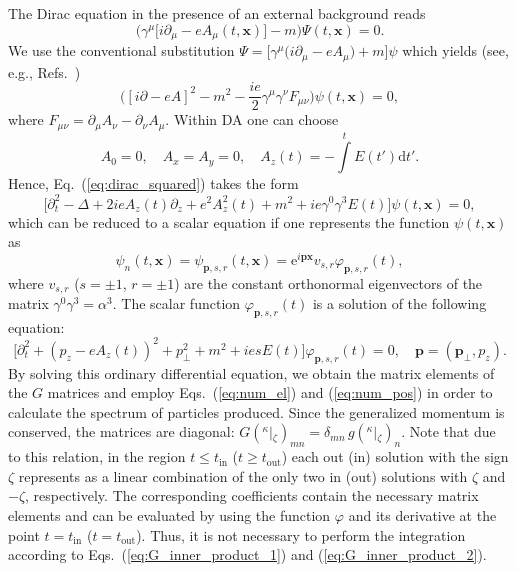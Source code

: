 \documentclass[preprint,aps,prd,showpacs,floatfix]{revtex4-1}
\begin{document}
\indent The Dirac equation in the presence of an external background reads
%
\begin{equation}
\big ( \gamma^\mu \big [i \partial_\mu - e A_\mu (t, \boldsymbol{x}) \big ] - m \big) \Psi (t, \boldsymbol{x}) = 0.
\label{eq:dirac_general}
\end{equation}
%
We use the conventional substitution $\Psi = \big [ \gamma^\mu \big (i \partial_\mu - e A_\mu \big ) + m \big] \psi$ which yields (see, e.g., Refs.~\cite{fradkin_gitman_shvartsman, gav_git_prd_1996})
%
\begin{equation}
\big ( [i \partial - e A ]^2 - m^2 - \frac{ie}{2} \gamma^\mu \gamma^\nu F_{\mu \nu} \big ) \psi (t, \boldsymbol{x}) = 0,
\label{eq:dirac_squared}
\end{equation}
%
where $F_{\mu \nu} = \partial_\mu A_\nu - \partial_\nu A_\mu$. Within DA one can choose
%
\begin{equation}
A_0 = 0, \quad A_x = A_y = 0,\quad A_z (t) = - \int \limits^t E(t') \mathrm{d} t'.
\label{eq:gauge_t}
\end{equation}
%
Hence, Eq.~(\ref{eq:dirac_squared}) takes the form
%
\begin{equation}
\big [\partial_t^2 - \Delta + 2 ie A_z (t) \partial_z + e^2 A_z^2 (t) + m^2 + ie \gamma^0 \gamma^3 E (t) \big ] \psi (t, \boldsymbol{x}) = 0,
\label{eq:dirac_t}
\end{equation}
%
which can be reduced to a scalar equation if one represents the function $\psi (t, \boldsymbol{x})$ as
%
\begin{equation}
\psi_n (t, \boldsymbol{x}) = \psi_{\boldsymbol{p}, s, r} (t, \boldsymbol{x}) = \mathrm{e}^{i\boldsymbol{p} \boldsymbol{x}} v_{s,r} \varphi_{\boldsymbol{p}, s, r} (t),
\label{eq:psi_t_spin}
\end{equation}
%
where $v_{s,r}$ ($s = \pm 1$, $r = \pm 1$) are the constant orthonormal eigenvectors of the matrix $\gamma^0 \gamma^3 = \alpha^3$. The scalar function $\varphi_{\boldsymbol{p}, s, r} (t)$ is a solution of the following equation:
%
\begin{equation}
\big [\partial_t^2 + (p_z - e A_z (t))^2 + p_\perp^2 + m^2 + iesE(t) \big ] \varphi_{\boldsymbol{p}, s, r} (t) = 0,\quad \boldsymbol{p} = (\boldsymbol{p}_\perp, p_z).
\label{eq:dirac_t_phi}
\end{equation}
%
By solving this ordinary differential equation, we obtain the matrix elements of the $G$ matrices and employ Eqs.~(\ref{eq:num_el}) and (\ref{eq:num_pos}) in order to calculate the spectrum of particles produced. Since the generalized momentum is conserved, the matrices are diagonal: $G ({}^\kappa|{}_\zeta)_{mn} = \delta_{mn} \, g ({}^\kappa|{}_\zeta)_{n}$. Note that due to this relation, in the region $t \leq t_\text{in}$ ($t \geq t_\text{out}$) each out (in) solution with the sign $\zeta$ represents as a linear combination of the only two in (out) solutions with $\zeta$ and $-\zeta$, respectively. The corresponding coefficients contain the necessary matrix elements and can be evaluated by using the function $\varphi$ and its derivative at the point $t = t_\text{in}$ ($t = t_\text{out}$). Thus, it is not necessary to perform the integration according to Eqs.~(\ref{eq:G_inner_product_1}) and (\ref{eq:G_inner_product_2}).
\end{document}
